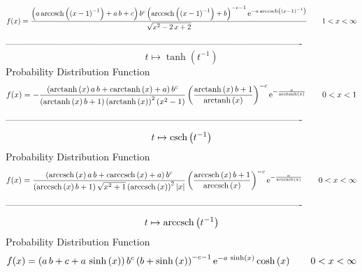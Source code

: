 \documentclass[12pt]{article}
\begin{document}
$$  f(x)={\frac { \left( a\,{\rm arccsch} \left( \left( x-1 \right) ^{-1}
\right)+a\,b+c \right) {b}^{c} \left( {\rm arccsch} \left( \left( x-1
 \right) ^{-1}\right)+b \right) ^{-c-1}{{\rm e}^{-a\,{\rm arccsch} 
\left( \left( x-1 \right) ^{-1}\right)}}}{\sqrt {{x}^{2}-2\,x+2}}}
 \qquad1
 < x < \infty 
$$-------------------------------------------------------------------------------------------  \\$$t\mapsto \tanh \left( {t}^{-1} \right) 
$$Probability Distribution Function 
$$  f(x)=-{\frac { \left( {\rm arctanh} \left(x\right)a\,b+c{\rm arctanh} 
\left(x\right)+a \right) {b}^{c}}{ \left( {\rm arctanh} \left(x\right)
b+1 \right)  \left( {\rm arctanh} \left(x\right) \right) ^{2} \left( {
x}^{2}-1 \right) } \left( {\frac {{\rm arctanh} \left(x\right)b+1}{
{\rm arctanh} \left(x\right)}} \right) ^{-c}{{\rm e}^{-{\frac {a}{
{\rm arctanh} \left(x\right)}}}}}
 \qquad0
 < x < 1
$$-------------------------------------------------------------------------------------------  \\$$t\mapsto {\rm csch} \left({t}^{-1}\right)
$$Probability Distribution Function 
$$  f(x)={\frac { \left( {\rm arccsch} \left(x\right)a\,b+c{\rm arccsch} \left(
x\right)+a \right) {b}^{c}}{ \left( {\rm arccsch} \left(x\right)b+1
 \right) \sqrt {{x}^{2}+1} \left( {\rm arccsch} \left(x\right)
 \right) ^{2} \left| x \right| } \left( {\frac {{\rm arccsch} \left(x
\right)b+1}{{\rm arccsch} \left(x\right)}} \right) ^{-c}{{\rm e}^{-{
\frac {a}{{\rm arccsch} \left(x\right)}}}}}
 \qquad0
 < x < \infty 
$$-------------------------------------------------------------------------------------------  \\$$t\mapsto {\rm arccsch} \left({t}^{-1}\right)
$$Probability Distribution Function 
$$  f(x)= \left( a\,b+c+a\,\sinh \left( x \right)  \right) {b}^{c} \left( b+
\sinh \left( x \right)  \right) ^{-c-1}{{\rm e}^{-a\,\sinh \left( x
 \right) }}\cosh \left( x \right) 
 \qquad0
 < x < \infty 
$$
\end{document}
